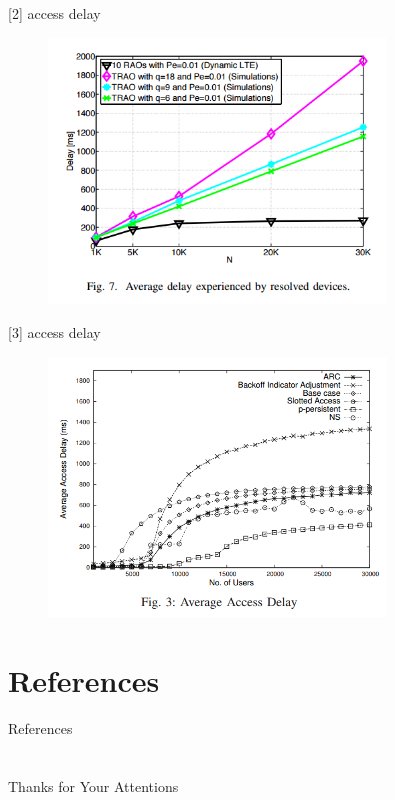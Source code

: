 \documentclass{beamer}
\begin{document}
\begin{frame}{[2] access delay}
    \begin{figure}[t]
        \centering
        \includegraphics[width=0.8\textwidth]{figures/ad2.png}
    \end{figure}
\end{frame}
\begin{frame}{[3] access delay}
    \begin{figure}[t]
        \centering
        \includegraphics[width=0.8\textwidth]{figures/ad3.png}
    \end{figure}
\end{frame}
\section{References}
\calcreferencespagetotal %
\begin{frame}[allowframebreaks]{References}
    \fontsize{9pt}{13}\selectfont
    
    
\end{frame}

\section{}

\begin{frame}
    \centering
    \Large{Thanks for Your Attentions}
\end{frame}
\end{document}
